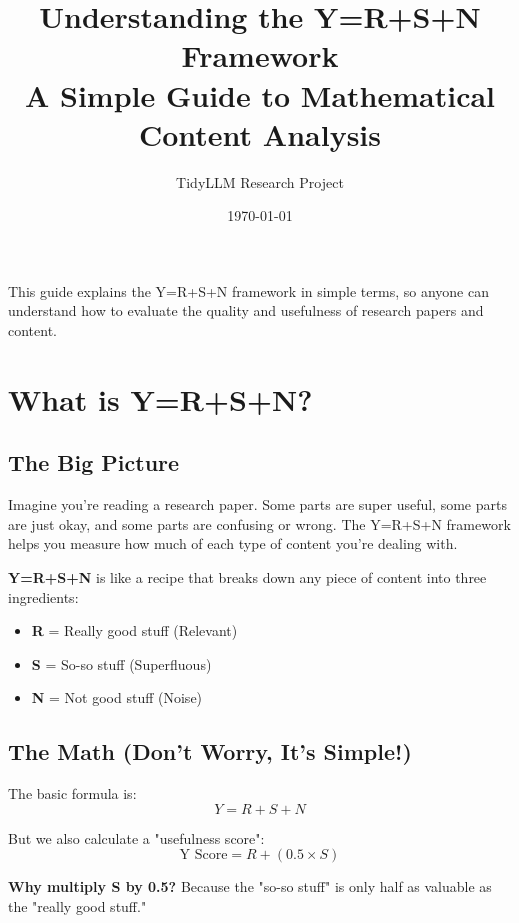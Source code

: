 \documentclass[11pt,a4paper]{article}
\title{\textbf{Understanding the Y=R+S+N Framework}\\
\large{A Simple Guide to Mathematical Content Analysis}}
\author{TidyLLM Research Project}
\date{\today}
\begin{document}
\maketitle

\begin{tcolorbox}[colback=infoblue!10,colframe=infoblue,title=What You'll Learn]
This guide explains the Y=R+S+N framework in simple terms, so anyone can understand how to evaluate the quality and usefulness of research papers and content.
\end{tcolorbox}

\tableofcontents
\newpage

\section{What is Y=R+S+N?}

\subsection{The Big Picture}
Imagine you're reading a research paper. Some parts are super useful, some parts are just okay, and some parts are confusing or wrong. The Y=R+S+N framework helps you measure how much of each type of content you're dealing with.

\begin{tcolorbox}[colback=successgreen!10,colframe=successgreen,title=Simple Definition]
\textbf{Y=R+S+N} is like a recipe that breaks down any piece of content into three ingredients:
\begin{itemize}
\item \textbf{R} = Really good stuff (Relevant)
\item \textbf{S} = So-so stuff (Superfluous) 
\item \textbf{N} = Not good stuff (Noise)
\end{itemize}
\end{tcolorbox}

\subsection{The Math (Don't Worry, It's Simple!)}

The basic formula is:
\[ Y = R + S + N \]

But we also calculate a "usefulness score":
\[ \text{Y Score} = R + (0.5 \times S) \]

\textbf{Why multiply S by 0.5?} Because the "so-so stuff" is only half as valuable as the "really good stuff."
\end{document}
